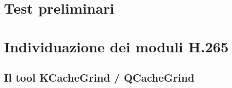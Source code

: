 \section{Test preliminari}
\section{Individuazione dei moduli H.265}

\subsection{Il tool KCacheGrind / QCacheGrind}


